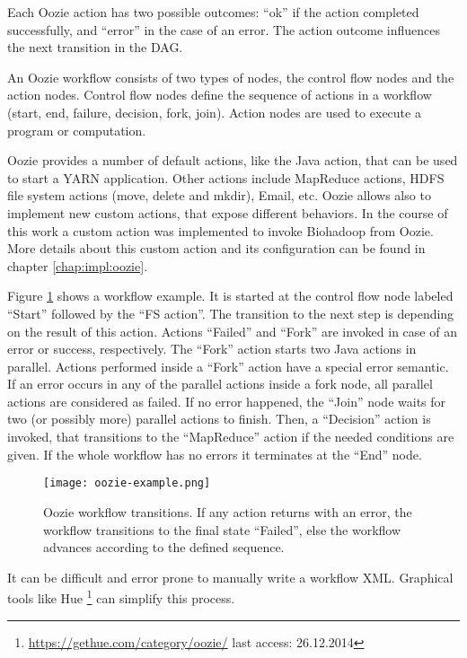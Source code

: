 Each Oozie action has two possible outcomes: ``ok'' if the action completed successfully, and ``error'' in the case of an error. The action outcome influences the next transition in the DAG. 

An Oozie workflow consists of two types of nodes, the control flow nodes and the action nodes. Control flow nodes define the sequence of actions in a workflow (start, end, failure, decision, fork, join). Action nodes are used to execute a program or computation.

Oozie provides a number of default actions, like the Java action, that can be used to start a YARN application. Other actions include MapReduce actions, HDFS file system actions (move, delete and mkdir), Email, etc. Oozie allows also to implement new custom actions, that expose different behaviors. In the course of this work a custom action was implemented to invoke Biohadoop from Oozie. More details about this custom action and its configuration can be found in chapter \ref{chap:impl:oozie}.

Figure \ref{fig:oozie-example} shows a workflow example. It is started at the control flow node labeled ``Start'' followed by  the ``FS action''. The transition to the next step is depending on the result of this action. Actions ``Failed'' and ``Fork'' are invoked in case of an error or success, respectively. The ``Fork'' action starts two Java actions in parallel. Actions performed inside a ``Fork'' action have a special error semantic. If an error occurs in any of the parallel actions inside a fork node, all parallel actions are considered as failed. If no error happened, the ``Join'' node waits for two (or possibly more) parallel actions to finish. Then, a ``Decision'' action is invoked, that transitions to the ``MapReduce'' action if the needed conditions are given. If the whole workflow has no errors it terminates at the ``End'' node.

\begin{figure}
  \centering
  \texttt{[image: oozie-example.png]}
  \caption[Oozie workflow transitions]{Oozie workflow transitions. If any action returns with an error, the workflow transitions to the final state ``Failed'', else the workflow advances according to the defined sequence.}
  \label{fig:oozie-example}
\end{figure}

It can be difficult and error prone to manually write a workflow XML. Graphical tools like Hue \footnote{\url{https://gethue.com/category/oozie/} last access: 26.12.2014} can simplify this process.